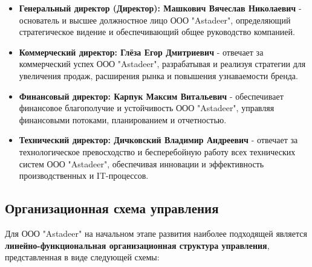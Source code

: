 \begin{itemize}
    \item \textbf{Генеральный директор (Директор): Машкович Вячеслав Николаевич} - основатель и высшее должностное лицо ООО "Astadeer", определяющий стратегическое видение и обеспечивающий общее руководство компанией.
    \item \textbf{Коммерческий директор: Глёза Егор Дмитриевич} - отвечает за коммерческий успех ООО "Astadeer", разрабатывая и реализуя стратегии для увеличения продаж, расширения рынка и повышения узнаваемости бренда.
    \item \textbf{Финансовый директор: Карпук Максим Витальевич} - обеспечивает финансовое благополучие и устойчивость ООО "Astadeer", управляя финансовыми потоками, планированием и отчетностью.
    \item \textbf{Технический директор: Дичковский Владимир Андреевич} - отвечает за технологическое превосходство и бесперебойную работу всех технических систем ООО "Astadeer", обеспечивая инновации и эффективность производственных и IT-процессов.
\end{itemize}

\subsection{Организационная схема управления}

Для ООО "Astadeer" на начальном этапе развития наиболее подходящей является \textbf{линейно-функциональная организационная структура управления}, представленная в виде следующей схемы:

\vspace{0.5cm}

\begin{center}
    
\end{center}

